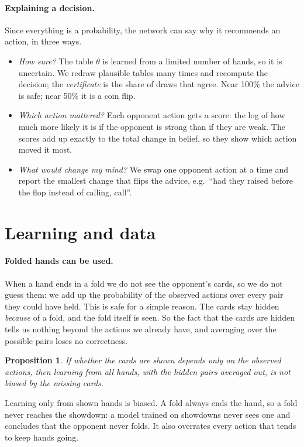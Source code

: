 \documentclass[11pt,a4paper]{article}
\newtheorem{proposition}{Proposition}
\begin{document}
\paragraph{Explaining a decision.} Since everything is a probability, the
network can say why it recommends an action, in three ways.
\begin{itemize}
  \item \emph{How sure?} The table $\theta$ is learned from a limited number of
        hands, so it is uncertain. We redraw plausible tables many times and
        recompute the decision; the \emph{certificate} is the share of draws
        that agree. Near 100\% the advice is safe; near 50\% it is a coin flip.
  \item \emph{Which action mattered?} Each opponent action gets a score: the
        log of how much more likely it is if the opponent is strong than if
        they are weak. The scores add up exactly to the total change in belief,
        so they show which action moved it most.
  \item \emph{What would change my mind?} We swap one opponent action at a
        time and report the smallest change that flips the advice, e.g.\ ``had
        they raised before the flop instead of calling, call''.
\end{itemize}

\section{Learning and data}\label{sec:learning}

\paragraph{Folded hands can be used.} When a hand ends in a fold we do not see
the opponent's cards, so we do not guess them: we add up the probability of the
observed actions over every pair they could have held. This is safe for a
simple reason. The cards stay hidden \emph{because} of a fold, and the fold
itself is seen. So the fact that the cards are hidden tells us nothing beyond
the actions we already have, and averaging over the possible pairs loses no
correctness.
\begin{proposition}\label{prop:ignore}
If whether the cards are shown depends only on the observed actions, then
learning from all hands, with the hidden pairs averaged out, is not biased by
the missing cards.
\end{proposition}
\noindent Learning only from shown hands is biased. A fold always ends the
hand, so a fold never reaches the showdown: a model trained on showdowns never
sees one and concludes that the opponent never folds. It also overrates every
action that tends to keep hands going.
\end{document}
